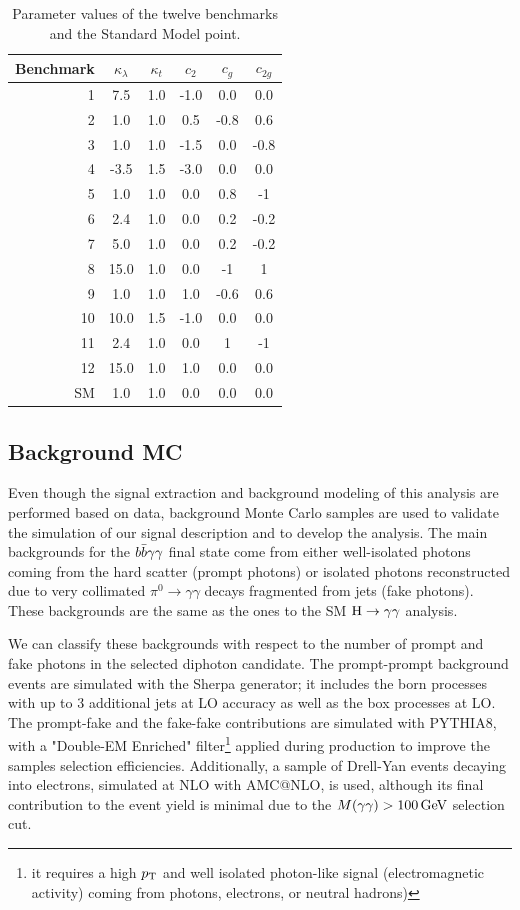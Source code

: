  \begin{table}[h]
\centering
\small{
\begin{tabular}{rccccc}
\hline
Benchmark & $\kappa_{\lambda}$ & $\kappa_{t}$ & $c_{2}$	& $c_{g}$ & $c_{2g}$ \\\hline
1 &	7.5	 & 1.0	 &	-1.0	& 0.0	& 0.0 \\
2 &	1.0	 & 1.0	 &	0.5		& -0.8	& 0.6 \\
3 &	1.0	 & 1.0	 &	-1.5	& 0.0	& -0.8 \\
4 &	-3.5 & 1.5  &	-3.0	& 0.0	& 0.0 \\
5 &	1.0	 & 1.0	 &	0.0		& 0.8	& -1 \\
6 &	2.4	 & 1.0	 &	0.0		& 0.2	& -0.2 \\
7 &	5.0	 & 1.0	 &	0.0		& 0.2	& -0.2 \\
8 &	15.0 & 1.0	 &	0.0		& -1	& 1 \\
9 &	1.0	 & 1.0	 &	1.0		& -0.6	& 0.6 \\
10 &	10.0 & 1.5   &	-1.0	& 0.0	& 0.0 \\
11 &	2.4	 & 1.0	 &	0.0		& 1		& -1 \\
12 &	15.0 & 1.0	 &	1.0		& 0.0	& 0.0 \\ \hline %
SM &	1.0 & 1.0	 &	0.0		& 0.0	& 0.0 \\
\hline
\end{tabular}
}
\caption{\small Parameter values of the twelve benchmarks and the Standard Model point.  \label{tab:bench}}
\end{table}
 
 \subsection{Background MC}

Even though the signal extraction and background modeling of this analysis are performed based on data, background Monte Carlo samples are used to validate the simulation of our signal description and to develop the analysis. The main backgrounds for the $b\bar{b}\gamma\gamma $ final state come from either well-isolated photons coming from the hard scatter (prompt photons) or isolated photons reconstructed due to very collimated $\pi^{0}\to\gamma\gamma$ decays fragmented from jets (fake photons). These backgrounds are the same as the ones to the SM $\mathrm{H}\to\gamma\gamma$ analysis.

We can classify these backgrounds with respect to the number of prompt and fake photons in the selected diphoton candidate. The prompt-prompt background events are simulated with the Sherpa generator; it includes the born processes with up to 3 additional jets at LO accuracy as well as the box processes at LO. The prompt-fake and the fake-fake contributions are simulated with PYTHIA8, with a "Double-EM Enriched" filter\footnote{it requires a high $p_{\mathrm{T}}$ and well isolated photon-like signal (electromagnetic activity) coming from photons, electrons, or neutral hadrons)} applied during production to improve the samples selection efficiencies. Additionally, a sample of Drell-Yan events decaying into electrons, simulated at NLO with AMC@NLO, is used, although its final contribution to the event yield is minimal due to the $M(\gamma\gamma) > 100 \,\text{Ge\hspace{-.08em}V}$ selection cut.

